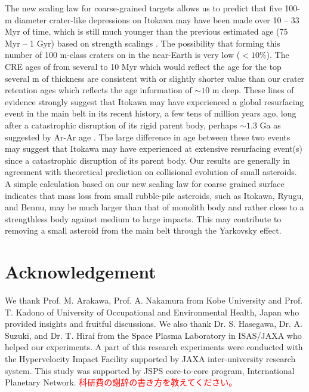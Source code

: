 \documentclass[3p,authoryear]{elsarticle}
\newcommand{\red}[1]{\textcolor{red}{#1}}
\begin{document}
The new scaling law for coarse-grained targets allows us to predict that five 100-m diameter crater-like depressions on Itokawa may have been made over 10 -- 33 Myr of time, which is still much younger than the previous estimated age (75 Myr -- 1 Gyr) based on strength scalings \citep{michel2009}.
The possibility that forming this number of 100 m-class craters on in the near-Earth is very low ($<10$\%).
The CRE ages of from several to 10 Myr which would reflect the age for the top several m of thickness \citep{nagao2011, meier2014, nishiizumi2015} are consistent with or slightly shorter value than  our crater retention ages which reflects the age information of $\sim 10$ m deep.
These lines of evidence strongly suggest that Itokawa may have experienced a global resurfacing event in the main belt in its recent history, a few tens of million years ago, long after a catastrophic disruption of its rigid parent body, perhaps $\sim 1.3$ Ga as suggested by Ar-Ar age \citep{park2015}.
The large difference in age between these two events may suggest that Itokawa may have experienced at extensive resurfacing event(s) since a catastrophic disruption of its parent body.
Our results are generally in agreement with theoretical prediction on collisional evolution of small asteroids.
A simple calculation based on our new scaling law for coarse grained surface indicates that mass loss from small rubble-pile asteroids, such as Itokawa, Ryugu, and Bennu, may be much larger than that of monolith body and rather close to a strengthless body against medium to large impacts.
This may contribute to removing a small asteroid from the main belt through the Yarkovsky effect.

\section*{Acknowledgement}
We thank Prof. M. Arakawa, Prof. A. Nakamura from Kobe University and Prof. T. Kadono of University of Occupational and Environmental Health, Japan who provided insights and fruitful discussions. We also thank Dr. S. Hasegawa, Dr. A. Suzuki, and Dr. T. Hirai from the Space Plasma Laboratory in ISAS/JAXA who helped our experiments. A part of this research experiments were conducted with the Hypervelocity Impact Facility supported by JAXA inter-university research system.
This study was supported by JSPS core-to-core program, International Planetary Network.
\red{科研費の謝辞の書き方を教えてください。}
\end{document}
